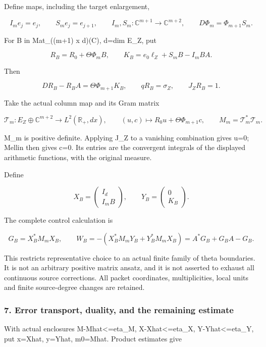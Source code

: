 Define maps, including the target enlargement,

\[I_m e_j=e_j,\qquad S_m e_j=e_{j+1},\qquad I_m,S_m:\mathbb C^{m+1}\to\mathbb C^{m+2},\qquad D\Phi_m=\Phi_{m+1}S_m.\]

For B in Mat\_((m+1) x d)(C), d=dim E\_Z, put

\[R_B=R_0+\Theta\Phi_mB,\qquad K_B=e_0\ell_Z+S_mB-I_mBA.\]

Then

\[DR_B-R_BA=\Theta\Phi_{m+1}K_B,\qquad qR_B=\sigma_Z,\qquad J_ZR_B=1.\]

Take the actual column map and its Gram matrix

\[\mathcal T_m:E_Z\oplus\mathbb C^{m+2}\to L^2(\mathbb R_+,dx),\qquad(u,c)\mapsto R_0u+\Theta\Phi_{m+1}c,\qquad M_m=\mathcal T_m^*\mathcal T_m.\]

M\_m is positive definite. Applying J\_Z to a vanishing combination gives u=0; Mellin then gives
c=0. Its entries are the convergent integrals of the displayed arithmetic functions, with the
original measure.

Define

\[X_B=\begin{pmatrix}I_d\\I_mB\end{pmatrix},\qquad Y_B=\begin{pmatrix}0\\K_B\end{pmatrix}.\]

The complete control calculation is

\[\boxed{G_B=X_B^*M_mX_B,\qquad W_B=-(X_B^*M_mY_B+Y_B^*M_mX_B)=A^*G_B+G_BA-G_B.}\]

This restricts representative choice to an actual finite family of theta boundaries. It is not an
arbitrary positive matrix ansatz, and it is not asserted to exhaust all continuous source
corrections. All packet coordinates, multiplicities, local units and finite source-degree changes
are retained.

\subsubsection{7. Error transport, duality, and the remaining
estimate}\label{pr_11:error-transport-duality-and-the-remaining-estimate}

With actual enclosures \textbar\textbar M-Mhat\textbar\textbar\textless=eta\_M,
\textbar\textbar X-Xhat\textbar\textbar\textless=eta\_X,
\textbar\textbar Y-Yhat\textbar\textbar\textless=eta\_Y, put
x=\textbar\textbar Xhat\textbar\textbar, y=\textbar\textbar Yhat\textbar\textbar,
m0=\textbar\textbar Mhat\textbar\textbar. Product estimates give

